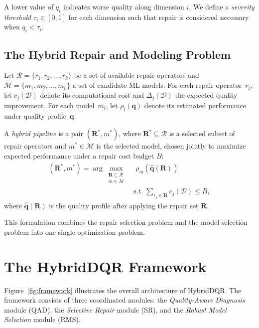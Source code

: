 \documentclass[runningheads]{llncs}
\begin{document}
A lower value of $q_i$ indicates worse quality along dimension $i$.
We define a \emph{severity threshold} $\tau_i \in [0,1]$ for each
dimension such that repair is considered necessary when $q_i < \tau_i$.

\subsection{The Hybrid Repair and Modeling Problem}

Let $\mathcal{R} = \{r_1, r_2, \ldots, r_k\}$ be a set of
available repair operators and
$\mathcal{M} = \{m_1, m_2, \ldots, m_p\}$ a set of candidate
ML models.
For each repair operator~$r_j$, let $c_j(\mathcal{D})$ denote
its computational cost and $\Delta_j(\mathcal{D})$ the expected
quality improvement.
For each model~$m_l$, let $\rho_l(\mathbf{q})$ denote its
estimated performance under quality profile~$\mathbf{q}$.

\begin{definition}
A \emph{hybrid pipeline} is a pair $(\mathbf{R}^*, m^*)$, where
$\mathbf{R}^* \subseteq \mathcal{R}$ is a selected subset of
repair operators and $m^* \in \mathcal{M}$ is the selected model,
chosen jointly to maximize expected performance under a repair
cost budget $B$:
\begin{equation}
\begin{split}
  (\mathbf{R}^*, m^*) = \arg\max_{\substack{\mathbf{R} \subseteq \mathcal{R} \\ m \in \mathcal{M}}}
  &\;\rho_m\!\left(\hat{\mathbf{q}}(\mathbf{R})\right) \\
  &\text{s.t.} \;\sum_{r_j \in \mathbf{R}} c_j(\mathcal{D}) \leq B,
\end{split}
\end{equation}
where $\hat{\mathbf{q}}(\mathbf{R})$ is the quality profile
after applying the repair set $\mathbf{R}$.
\end{definition}

This formulation combines the repair selection problem and the
model selection problem into one single optimization problem.

\section{The HybridDQR Framework}
\label{sec:framework}

Figure~\ref{fig:framework} illustrates the overall architecture of
HybridDQR.
The framework consists of three coordinated modules:
the \emph{Quality-Aware Diagnosis} module (QAD),
the \emph{Selective Repair} module (SR),
and the \emph{Robust Model Selection} module (RMS).
\end{document}
